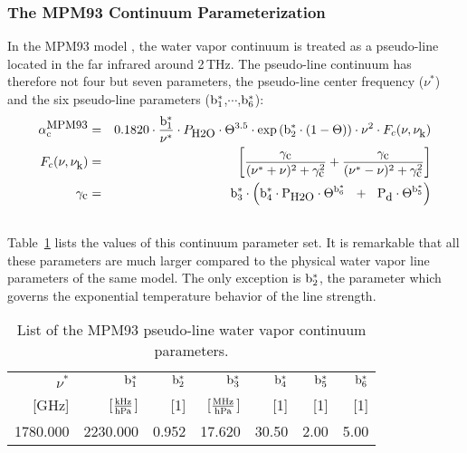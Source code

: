 \subsubsection{The MPM93 Continuum Parameterization}
\label{leveld:mpm93:contabs}
In the MPM93 model \citep{liebeetal:93}, the water 
vapor continuum is treated as a pseudo-line located in the far infrared 
around 2\,THz. The pseudo-line continuum has therefore not four but seven 
parameters, the pseudo-line center frequency ($\nu^*$) and the six 
pseudo-line parameters ($\rm b^*_{\rm 1}$,$\cdots$,$\rm b^*_{\rm 6}$):
%
\begin{eqnarray}
  \label{eq:mpm93:contabs}
  \alphampmnc & = & 0.1820 \cdot \frac{\beks}{\nu^*} \cdot \phzo \cdot 
                \Theta^{3.5} \cdot \exp{\left(\bzks\cdot(1-\Theta)\right)} \cdot 
                \nu^2 \cdot \shapec\\
%
  \label{eq:mpm93:contabs1}
   \shapec & = & \left[\frac{\gamc}{(\nu^*+\nu)^2+\gamc^2} + 
                       \frac{\gamc}{(\nu^*-\nu)^2+\gamc^2}\right]\\
%
  \label{eq:mpm93:contabs2}
  \gamc & = &  \bdks \cdot 
        \left(\bvks \cdot \phzo \cdot \Theta^{\bsks}~~+~~ 
                          \pda  \cdot \Theta^{\bfks}\right)\\
  \nonumber
\end{eqnarray}
%
Table~\ref{tab:mpm93_cont_param} lists the values of this continuum 
parameter set. It is remarkable that all these parameters are much 
larger compared to the physical water vapor line parameters of the 
same model. The only exception is $\rm b^*_{\rm 2}$, the parameter 
which governs the exponential temperature behavior of the line strength. 
%
\begin{table}[!hbt]
  \begin{center}
  \begin{tabular}{rrrrrrr}
   \hline
   $\nu^*$ & $\rm b^*_{\rm 1}$ & $\rm b^*_{\rm 2}$ & $\rm b^*_{\rm 3}$ & $\rm b^*_{\rm 4}$ & $\rm b^*_{\rm 5}$ & $\rm b^*_{\rm 6}$\\
   {\rm [GHz]}  & {[$\frac{\rm kHz}{\rm hPa}$]} & {\rm [1]} & 
   {[$\frac{\rm MHz}{\rm hPa}$]} & {\rm [1]} & {\rm [1]} & {\rm [1]} \\
    \hline
   1780.000 & 2230.000 & 0.952 & 17.620 & 30.50 & 2.00 & 5.00 \\
   \hline
  \end{tabular}
  \end{center}
  \caption{List of the MPM93 pseudo-line water vapor continuum parameters.}
  \label{tab:mpm93_cont_param}
\end{table}
